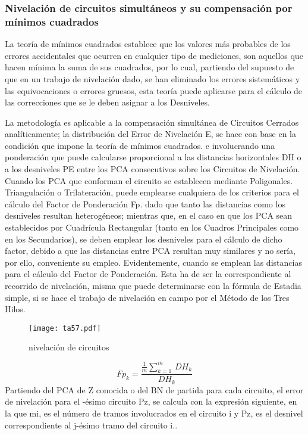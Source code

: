 \subsubsection{Nivelación de circuitos simultáneos y su compensación por mínimos cuadrados}
La teoría de mínimos cuadrados establece que los valores más probables de los errores accidentales que ocurren en cualquier tipo de mediciones, son aquellos que hacen mínima la suma de sus cuadrados, por lo cual, partiendo del supuesto de que en un trabajo de nivelación dado, se han eliminado los errores sistemáticos y las equivocaciones o errores gruesos, esta teoría puede aplicarse para el cálculo de las correcciones que se le deben asignar a los Desniveles.

La metodología es aplicable a la compensación simultánea de Circuitos Cerrados analíticamente; la distribución del Error de Nivelación E, se hace con base en la condición que impone la teoría de mínimos cuadrados. e involucrando una ponderación que puede calcularse proporcional a las distancias horizontales DH o a los desniveles PE entre los PCA consecutivos sobre los Circuitos de Nivelación. Cuando los PCA que conforman el circuito se establecen mediante Poligonales. Triangulación o Trilateración, puede emplearse cualquiera de los criterios para el cálculo del Factor de Ponderación Fp. dado que tanto las distancias como los desniveles resultan heterogéneos; mientras que, en el caso en que los PCA sean establecidos por Cuadrícula Rectangular (tanto en los Cuadros Principales como en los Secundarios), se deben emplear los desniveles para el cálculo de dicho factor, debido a que las distancias entre PCA resultan muy similares y no sería, por ello, conveniente su empleo. Evidentemente, cuando se emplean las distancias para el cálculo del Factor de Ponderación. Esta ha de ser la correspondiente al recorrido de nivelación, misma que puede determinarse con la fórmula de Estadia simple, si se hace el trabajo de nivelación en campo por el Método de los Tres Hilos.
\begin{figure}[h!]
\centering
  \texttt{[image: ta57.pdf]}
  \caption{nivelación de circuitos}
  \label{ta57}
\end{figure}
\begin{equation}
    Fp_k =\frac{\frac{1}{m}\sum_{k = 1}^m\,DH_k}{DH_k}
\end{equation}
Partiendo del PCA de Z conocida o del BN de partida para cada circuito, el error de nivelación para el -ésimo circuito Pz, se calcula con la expresión siguiente, en la que mi, es el número de tramos involucrados en el circuito i y Pz, es el desnivel correspondiente al j-ésimo tramo del circuito i..

